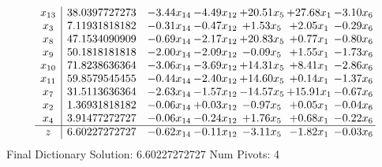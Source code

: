 \documentclass[9pt]{article}
\begin{document}
 \[\begin{array}{c| c c@{\hskip 2pt} c@{\hskip 2pt} c@{\hskip 2pt} c@{\hskip 2pt} c@{\hskip 2pt} }
 x_{13}   &  38.0397727273 & -3.44 x_{14} & -4.49 x_{12} & + 20.51 x_{5} & + 27.68 x_{1} & -3.10 x_{6}\\
 x_{3}   &  7.11931818182 & -0.31 x_{14} & -0.47 x_{12} & +  1.53 x_{5} & +  2.05 x_{1} & -0.29 x_{6}\\
 x_{8}   &  47.1534090909 & -0.69 x_{14} & -2.17 x_{12} & + 20.83 x_{5} & +  0.77 x_{1} & -0.80 x_{6}\\
 x_{9}   &  50.1818181818 & -2.00 x_{14} & -2.09 x_{12} & -0.09 x_{5} & +  1.55 x_{1} & -1.73 x_{6}\\
 x_{10}   &  71.8238636364 & -3.06 x_{14} & -3.69 x_{12} & + 14.31 x_{5} & +  8.41 x_{1} & -2.86 x_{6}\\
 x_{11}   &  59.8579545455 & -0.44 x_{14} & -2.40 x_{12} & + 14.60 x_{5} & +  0.14 x_{1} & -1.37 x_{6}\\
 x_{7}   &  31.5113636364 & -2.63 x_{14} & -1.57 x_{12} & -14.57 x_{5} & + 15.91 x_{1} & -0.67 x_{6}\\
 x_{2}   &  1.36931818182 & -0.06 x_{14} & +  0.03 x_{12} & -0.97 x_{5} & +  0.05 x_{1} & -0.04 x_{6}\\
 x_{4}   &  3.91477272727 & -0.06 x_{14} & -0.24 x_{12} & +  1.76 x_{5} & +  0.68 x_{1} & -0.22 x_{6}\\
\hline
z    &  6.60227272727 & -0.62 x_{14} & -0.11 x_{12} & -3.11 x_{5} & -1.82 x_{1} & -0.03 x_{6}\\
\end{array}\]
Final Dictionary
Solution:  6.60227272727
Num Pivots:  4
\end{document}

